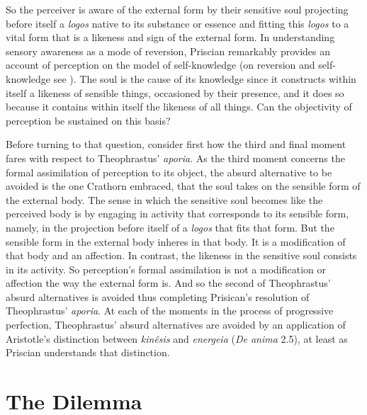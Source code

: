 \documentclass[12pt]{article}
\begin{document}
So the perceiver is aware of the external form by their sensitive soul projecting before itself a \emph{logos} native to its substance or essence and fitting this \emph{logos} to a vital form that is a likeness and sign of the external form. In understanding sensory awareness as a mode of reversion, Priscian remarkably provides an account of perception on the model of self-knowledge (on reversion and self-knowledge see \citealt{Lautner:1994cs}). The soul is the cause of its knowledge since it constructs within itself a likeness of sensible things, occasioned by their presence, and it does so because it contains within itself the likeness of all things. Can the objectivity of perception be sustained on this basis?

Before turning to that question, consider first how the third and final moment fares with respect to Theophrastus' \emph{aporia}. As the third moment concerns the formal assimilation of perception to its object, the absurd alternative to be avoided is the one Crathorn embraced, that the soul takes on the sensible form of the external body. The sense in which the sensitive soul becomes like the perceived body is by engaging in activity that corresponds to its sensible form, namely, in the projection before itself of a \emph{logos} that fits that form. But the sensible form in the external body inheres in that body. It is a modification of that body and an affection. In contrast, the likeness in the sensitive soul consists in its activity. So perception's formal assimilation is not a modification or affection the way the external form is. And so the second of Theophrastus' absurd alternatives is avoided thus completing Prisican's resolution of Theophrastus' \emph{aporia}. At each of the moments in the process of progressive perfection, Theophrastus' absurd alternatives are avoided by an application of Aristotle’s distinction between \emph{kinêsis} and \emph{energeia} (\emph{De anima} 2.5), at least as Priscian understands that distinction.



\section{The Dilemma} %
\label{sec:some_related_problems_ldots}
\end{document}
